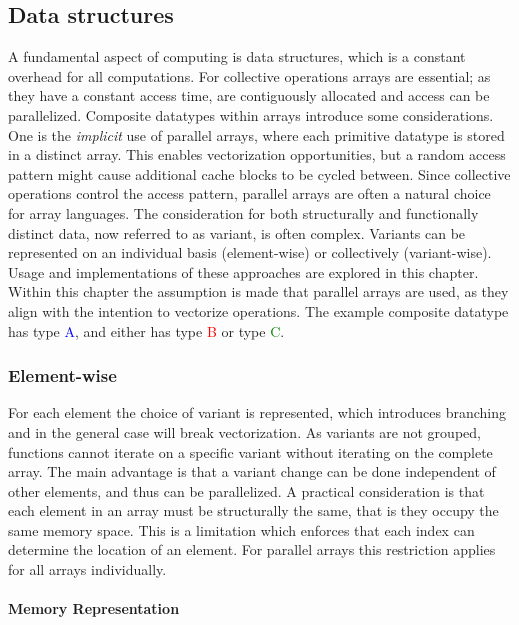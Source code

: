 \documentclass{article}
\begin{document}
\newpage

\subsection{Data structures}

A fundamental aspect of computing is data structures, which is a constant overhead for all computations.
For collective operations arrays are essential; as they have a constant access time, are contiguously allocated and access can be parallelized.
Composite datatypes within arrays introduce some considerations.
One is the {\it implicit} use of parallel arrays, where each primitive datatype is stored in a distinct array.
This enables vectorization opportunities, but a random access pattern might cause additional cache blocks to be cycled between.
Since collective operations control the access pattern, parallel arrays are often a natural choice for array languages.
The consideration for both structurally and functionally distinct data, now referred to as variant, is often complex.
Variants can be represented on an individual basis (element-wise) or collectively (variant-wise).
Usage and implementations of these approaches are explored in this chapter. 
Within this chapter the assumption is made that parallel arrays are used, as they align with the intention to vectorize operations. 
The example composite datatype has type \textcolor{blue}{A}, and either has type \textcolor{red}{B} or type \textcolor{green}{C}.

\subsubsection{Element-wise}

For each element the choice of variant is represented, which introduces branching and in the general case will break vectorization.
As variants are not grouped, functions cannot iterate on a specific variant without iterating on the complete array.
The main advantage is that a variant change can be done independent of other elements, and thus can be parallelized.
A practical consideration is that each element in an array must be structurally the same, that is they occupy the same memory space.
This is a limitation which enforces that each index can determine the location of an element. 
For parallel arrays this restriction applies for all arrays individually\cite{accelerate-sum-types}.

\paragraph{Memory Representation}
\end{document}
